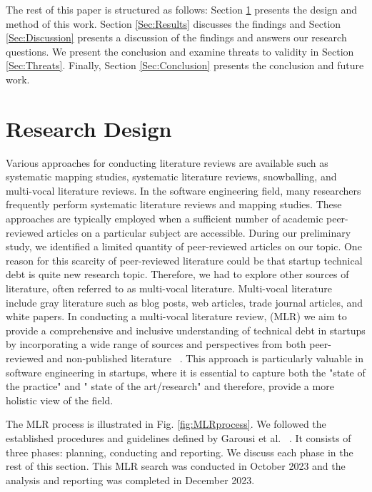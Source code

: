 The rest of this paper is structured as follows: Section \ref{Sec:Research} presents the design and method of this work. Section \ref{Sec:Results} discusses the findings and Section \ref{Sec:Discussion} presents a discussion of the findings and answers our research questions. We present the conclusion and examine threats to validity in Section \ref{Sec:Threats}. Finally, Section \ref{Sec:Conclusion} presents the conclusion and future work.

\section{Research Design}\label{Sec:Research}
Various approaches for conducting literature reviews are available such as systematic mapping studies, systematic literature reviews, snowballing, and multi-vocal literature reviews. In the software engineering field, many researchers frequently perform systematic literature reviews and mapping studies. These approaches are typically employed when a sufficient number of academic peer-reviewed articles on a particular subject are accessible. During our preliminary study, we identified a limited quantity of peer-reviewed articles on our topic. One reason for this scarcity of peer-reviewed literature could be that startup technical debt is quite new research topic. Therefore, we had to explore other sources of literature, often referred to as multi-vocal literature. Multi-vocal literature include gray literature such as blog posts, web articles, trade journal articles, and white papers. In conducting a multi-vocal literature review, (MLR) we aim to provide a comprehensive and inclusive understanding of technical debt in startups by incorporating a wide range of sources and perspectives from both peer-reviewed and non-published literature ~\cite{Ogawa91, Garousi2016/2915970.2916008}. This approach is particularly valuable in software engineering in startups, where it is essential to capture both the "state of the practice" and " state of the art/research" and therefore, provide a more holistic view of the field. 

The MLR process is illustrated in Fig. \ref{fig:MLRprocess}. We followed the established procedures and guidelines defined by Garousi et al. ~\cite{GAROUSI2019101}. It consists of three phases: planning, conducting and reporting. We discuss each phase in the rest of this section. This MLR search was conducted in October 2023 and the analysis and reporting was completed in December 2023.

